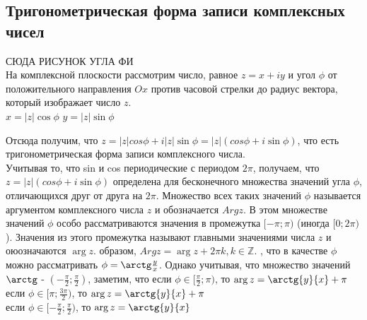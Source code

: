 \documentclass[oneside]{book}
\begin{document}
\begin{enumerate}
\begin{itemize}
\begin{enumerate}
\section{Тригонометрическая форма записи комплексных чисел}
СЮДА РИСУНОК УГЛА ФИ\\
На комплексной плоскости рассмотрим число, равное $z=x+iy$ и угол $\phi$ от положительного направления $Ox$ против часовой стрелки до радиус вектора, который изображает число $z$.\\
$x=|z|\cos\phi$
$y=|z|\sin\phi$
\par Отсюда получим, что $z=|z|cos\phi+i|z|\sin\phi=|z|(cos\phi+i\sin\phi)$, что есть тригонометрическая форма записи комплексного числа.\\
Учитывая то, что sin и cos периодические с периодом $2\pi$, получаем, что $z=|z|(cos\phi+i\sin\phi)$ определена для бесконечного множества значений угла $\phi$, отличающихся друг от друга на $2\pi$. Множество всех таких значений $\phi$ называется аргументом комплексного числа $z$ и обозначается $Argz$. В этом множестве значений $\phi$ особо рассматриваются значения в промежутка $[-\pi;\pi)$ (иногда $[0; 2\pi)$). Значения из этого промежутка называют главными значениями числа $z$ и оюозначаются $\arg z$.
 образом, $Argz = \arg z + 2\pi k, k \in \mathbb{Z}$.
, что в качестве $\phi$ можно рассматривать $\phi=\arctg\frac{y}{x}$. Однако учитывая, что множество значений $\arctg$ - $(-\frac{\pi}{2}; \frac{\pi}{2})$, заметим, что если $\phi \in [\frac{\pi}{2}; \pi)$, то $\arg z = \arctg{y}{x}+\pi$\\
если $\phi \in [\pi;\frac{3\pi}{2})$, то $\arg z = \arctg{y}{x}+\pi$\\
если $\phi \in [-\frac{\pi}{2}; \frac{\pi}{2})$, то $\arg z = \arctg{y}{x}$\\

\end{enumerate}
\end{itemize}
\end{enumerate}
\end{document}
